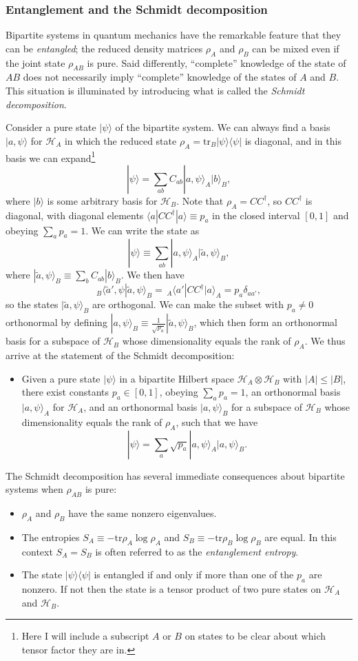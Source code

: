 \documentclass[12pt]{article}
\newcommand{\be}{\begin{equation}}
\newcommand{\ee}{\end{equation}}
\newcommand{\HA}{\mathcal{H}_A}
\newcommand{\HB}{\mathcal{H}_B}
\newcommand{\lan}{\langle}
\newcommand{\ran}{\rangle}
\newcommand{\tr}{\mathrm{tr}}
\begin{document}
\subsubsection{Entanglement and the Schmidt decomposition}
Bipartite systems in quantum mechanics have the remarkable feature that they can be \textit{entangled}; the reduced density matrices $\rho_A$ and $\rho_B$ can be mixed even if the joint state $\rho_{AB}$ is pure.  Said differently, ``complete'' knowledge of the state of $AB$ does not necessarily imply ``complete'' knowledge of the states of $A$ and $B$. This situation is illuminated by introducing what is called the \textit{Schmidt decomposition}.  

Consider a pure state $|\psi\ran$ of the bipartite system.  We can always find a basis $|a,\psi\ran$ for $\HA$ in which the reduced state $\rho_A=\tr_B|\psi\ran\lan\psi|$ is diagonal, and in this basis we can expand\footnote{Here I will include a subscript $A$ or $B$ on states to be clear about which tensor factor they are in.}
\be
|\psi\ran=\sum_{ab}C_{ab}|a,\psi\ran_A|b\ran_B,
\ee
where $|b\ran$ is some arbitrary basis for $\HB$.  Note that $\rho_A=C C^\dagger$, so $C C^\dagger$ is diagonal, with diagonal elements $\lan a|C C^\dagger |a\ran\equiv p_a$ in the closed interval $[0,1]$ and obeying $\sum_a p_a=1$.  We can write the state as
\be
|\psi\ran\equiv \sum_{ab}|a,\psi\ran_A|\tilde{a},\psi\ran_B,
\ee
where $|\tilde{a},\psi\ran_B\equiv \sum_b C_{ab}|b\ran_B$.  We then have
\be
_{B}\lan \tilde{a}',\psi|\tilde{a},\psi\ran_B=\, _{A}\lan a'|C C^\dagger|a\ran_A=p_a \delta_{aa'},
\ee
so the states $|\tilde{a},\psi\ran_B$ are orthogonal.  We can make the subset with $p_a\neq 0$ orthonormal by defining $|a,\psi\ran_B\equiv \frac{1}{\sqrt{p_a}}|\tilde{a},\psi\ran_B$, which then form an orthonormal basis for a subspace of $\HB$ whose dimensionality equals the rank of $\rho_A$.  We thus arrive at the statement of the Schmidt decomposition:
\begin{itemize}
\item Given a pure state $|\psi\ran$ in a bipartite Hilbert space $\HA\otimes \HB$ with $|A|\leq |B|$, there exist constants $p_a\in [0,1]$, obeying $\sum_a p_a=1$, an orthonormal basis $|a,\psi\ran_A$ for $\HA$, and an orthonormal basis $|a,\psi\ran_B$ for a subspace of $\HB$ whose dimensionality equals the rank of $\rho_A$, such that we have
\be
|\psi\ran=\sum_a \sqrt{p_a} |a,\psi\ran_A|a,\psi\ran_B.
\ee
\end{itemize}

The Schmidt decomposition has several immediate consequences about bipartite systems when $\rho_{AB}$ is pure:
\begin{itemize}
\item $\rho_A$ and $\rho_B$ have the same nonzero eigenvalues.
\item The entropies $S_A\equiv -\tr \rho_A \log \rho_A$ and $S_B\equiv -\tr \rho_B \log \rho_B$ are equal.  In this context $S_A=S_B$ is often referred to as the \textit{entanglement entropy}.
\item The state $|\psi\ran\lan\psi|$ is entangled if and only if more than one of the $p_a$ are nonzero. If not then the state is a tensor product of two pure states on $\HA$ and $\HB$.  
\end{itemize}
\end{document}
